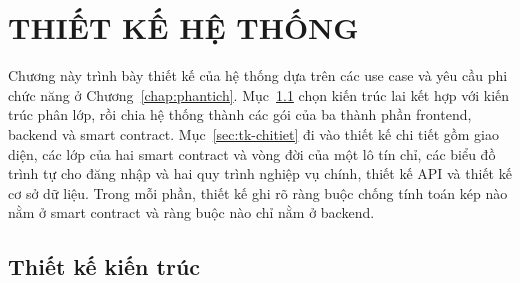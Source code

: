 %

\chapter{THIẾT KẾ HỆ THỐNG}
\label{chap:thietke}


Chương này trình bày thiết kế của hệ thống dựa trên các use case và yêu cầu phi chức năng ở Chương~\ref{chap:phantich}. Mục~\ref{sec:tk-kientruc} chọn kiến trúc lai kết hợp với kiến trúc phân lớp, rồi chia hệ thống thành các gói của ba thành phần frontend, backend và smart contract. Mục~\ref{sec:tk-chitiet} đi vào thiết kế chi tiết gồm giao diện, các lớp của hai smart contract và vòng đời của một lô tín chỉ, các biểu đồ trình tự cho đăng nhập và hai quy trình nghiệp vụ chính, thiết kế API và thiết kế cơ sở dữ liệu. Trong mỗi phần, thiết kế ghi rõ ràng buộc chống tính toán kép nào nằm ở smart contract và ràng buộc nào chỉ nằm ở backend.

\section{Thiết kế kiến trúc}
\label{sec:tk-kientruc}

